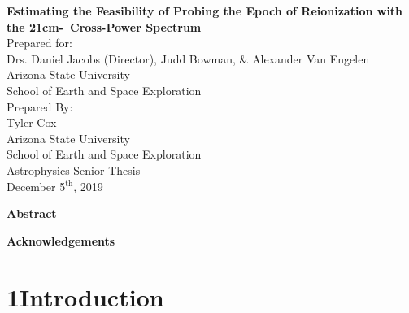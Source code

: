 \documentclass[12pt]{article}
\begin{document}
\doublespacing
\thispagestyle{empty}
\newpage
{}

\begin{center}
	{\Large \textbf{Estimating the Feasibility of Probing the Epoch of Reionization with the
									21cm-\lya\ Cross-Power Spectrum}} \\
	[0.15\textheight]

	Prepared for: \\
	Drs. Daniel Jacobs (Director), Judd Bowman, \&  Alexander Van Engelen\\
	Arizona State University \\
	School of Earth and Space Exploration \\[0.15\textheight]

	Prepared By: \\
	Tyler Cox \\
	Arizona State University \\
	School of Earth and Space Exploration \\
	Astrophysics Senior Thesis \\
	December 5$^{\textrm{th}}$, 2019 \\
	[0.15\textheight]

\end{center}
\thispagestyle{empty}

\clearpage
{}

\begin{center}
	\textbf{Abstract}
\end{center}



\begingroup
\hypersetup{
	citecolor=DarkBlue,
	filecolor=black,
	linkcolor=black,
	urlcolor=DarkBlue
}
\renewcommand{\thesection}{\Roman{section}}
\tableofcontents
\listoffigures
\endgroup

\newpage

	\begin{center}
		\textbf{Acknowledgements}
	\end{center}

		




\tocless\section{\hypertarget{sec:introduction}{1\hspace{0.75em}Introduction}}
\end{document}
